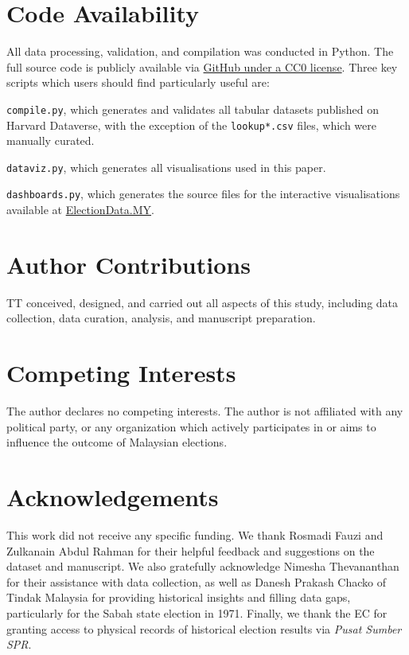 \documentclass[11pt]{article}
\begin{document}
\section*{Code Availability}

All data processing, validation, and compilation was conducted in Python. The full source code is publicly available via \href{https://github.com/Thevesh/paper-malaysian-election-corpus}{GitHub under a CC0 license}. Three key scripts which users should find particularly useful are:

\begin{enumbul}
\item \texttt{compile.py}, which generates and validates all tabular datasets published on Harvard Dataverse, with the exception of the \texttt{lookup*.csv} files, which were manually curated.
\item \texttt{dataviz.py}, which generates all visualisations used in this paper.
\item \texttt{dashboards.py}, which generates the source files for the interactive visualisations available at \href{https://electiondata.my}{ElectionData.MY}.
\end{enumbul}

\begingroup
\raggedright
\linespread{1.1}
\small
\let\oldthebibliography\thebibliography

\endgroup

\section*{Author Contributions}
TT conceived, designed, and carried out all aspects of this study, including data collection, data curation, analysis, and manuscript preparation.

\section*{Competing Interests}
The author declares no competing interests. The author is not affiliated with any political party, or any organization which actively participates in or aims to influence the outcome of Malaysian elections.

\section*{Acknowledgements}
This work did not receive any specific funding. We thank Rosmadi Fauzi and Zulkanain Abdul Rahman for their helpful feedback and suggestions on the dataset and manuscript. We also gratefully acknowledge Nimesha Thevananthan for their assistance with data collection, as well as Danesh Prakash Chacko of Tindak Malaysia for providing historical insights and filling data gaps, particularly for the Sabah state election in 1971. Finally, we thank the EC for granting access to physical records of historical election results via \textit{Pusat Sumber SPR}.
\end{document}
